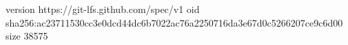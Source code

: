 version https://git-lfs.github.com/spec/v1
oid sha256:ac23711530cc3e0dcd44dc6b7022ac76a2250716da3e67d0c5266207ce9c6d00
size 38575
